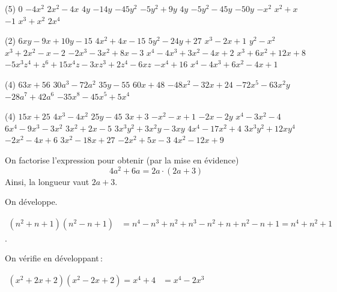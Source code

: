 \documentclass[a4paper,12pt]{report}
\begin{document}
\vspace*{-2\baselineskip}

\begin{core}
	\phantom{}
\begin{tasks}(5)
\task $0$
\task $-4x^2$
\task $2x^2 - 4x$
\task $4y$
\task $-14y$
\task $-45y^2$
\task $-5y^2 + 9y$
\task $4y$
\task $-5y^2 - 45y$
\task $-50y$
\task $-x^2$
\task $x^2 + x$
\task $-1$
\task $x^3 + x^2$
\task $2x^4$
\end{tasks}
\end{core}

\begin{core}
	\phantom{}
\begin{tasks}(2)
\task $6xy - 9x + 10y - 15$
\task $4x^2 + 4x - 15$
\task $5y^2 - 24y + 27$
\task $x^3 - 2x + 1$
\task $y^2 - x^2$
\task $x^3 + 2x^2 - x - 2$
\task $-2x^3 - 3x^2 + 8x - 3$
\task $x^4 - 4x^3 + 3x^2 - 4x + 2$
\task $x^3 + 6x^2 + 12x + 8$
\task $-5x^3z^4+z^6 + 15x^4z - 3xz^3+2z^4 - 6xz$
\task $-x^4 + 16$
\task $x^4 - 4x^3 + 6x^2 - 4x + 1$
\end{tasks}
\end{core}

\begin{core}
	\phantom{}
\begin{tasks}(4)
\task $63x + 56$
\task $30a^3 - 72a^2$
\task $35y - 55$
\task $60x + 48$
\task $-48x^2 - 32x + 24$
\task $-72x^5 - 63x^2y$
\task $-28a^7+42a^6$
\task $-35x^8 - 45x^5 + 5x^4$
\end{tasks}
\end{core}

\begin{core}
	\phantom{}
\begin{tasks}(4) 
\task $15x + 25$
\task $4x^3 - 4x^2$
\task $25y - 45$
\task $3x+3$
\task $-x^2-x+1$
\task $-2x - 2y$
\task $x^4 - 3x^2 - 4$
\task $6x^4 - 9x^3 - 3x^2$
\task $3x^2+ 2x-5$
\task $3x^3y^2 + 3x^2y - 3xy$
\task $4x^4 - 17x^2 + 4$
\task $3x^3y^2 + 12xy^4$
\task $-2x^2 - 4x + 6$
\task $3x^2 - 18x + 27$
\task $-2x^2 + 5x - 3$
\task $4x^2 - 12x + 9$
\end{tasks}
\end{core}
\begin{core}
\phantom{}
On factorise l'expression pour obtenir (par la mise en évidence) 
\[4a^2+6a=2a\cdot (2a+3)\]
Ainsi, la longueur vaut $2a+3$.
\end{core}
\begin{core}
On développe.

	$\begin{aligned}\left(n^2+n+1\right)\left(n^2-n+1\right)&=n^4-n^3+n^2+n^3-n^2+n+n^2-n+1=n^4+n^2+1
	\end{aligned}$. 
\end{core}
\begin{core}
	On vérifie en développant\,:

	$\begin{aligned}\left(x^2+2 x+2\right)\left(x^2-2 x+2\right)=x^4+4&=x^4-2x^3\\
	\end{aligned}$
\end{core}
\end{document}
